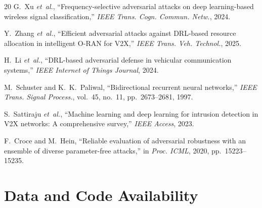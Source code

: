 \documentclass[conference]{IEEEtran}
\begin{document}
\begin{thebibliography}{20}
G.~Xu \textit{et~al.}, ``Frequency-selective adversarial attacks on deep learning-based wireless signal classification,'' \textit{IEEE Trans. Cogn. Commun. Netw.}, 2024.

Y.~Zhang \textit{et~al.}, ``Efficient adversarial attacks against DRL-based resource allocation in intelligent O-RAN for V2X,'' \textit{IEEE Trans. Veh. Technol.}, 2025.

H.~Li \textit{et~al.}, ``DRL-based adversarial defense in vehicular communication systems,'' \textit{IEEE Internet of Things Journal}, 2024.

M.~Schuster and K.~K.~Paliwal, ``Bidirectional recurrent neural networks,'' \textit{IEEE Trans. Signal Process.}, vol.~45, no.~11, pp.~2673--2681, 1997.

S.~Sattiraju \textit{et~al.}, ``Machine learning and deep learning for intrusion detection in V2X networks: A comprehensive survey,'' \textit{IEEE Access}, 2023.

F.~Croce and M.~Hein, ``Reliable evaluation of adversarial robustness with an ensemble of diverse parameter-free attacks,'' in \textit{Proc. ICML}, 2020, pp.~15223--15235.

\end{thebibliography}

\section*{Data and Code Availability}
\label{sec:code}
\end{document}
